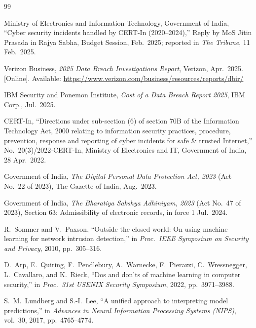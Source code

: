\documentclass[12pt,a4paper,oneside]{article}
\begin{document}
\begingroup
{}\small
\renewcommand{\refname}{\color{rblue}References}
\begin{thebibliography}{99}

 Ministry of Electronics and Information Technology, Government of India, ``Cyber security incidents handled by CERT-In (2020--2024),'' Reply by MoS Jitin Prasada in Rajya Sabha, Budget Session, Feb.\ 2025; reported in \emph{The Tribune}, 11 Feb.\ 2025.

 Verizon Business, \emph{2025 Data Breach Investigations Report}, Verizon, Apr.\ 2025. [Online]. Available: \url{https://www.verizon.com/business/resources/reports/dbir/}

 IBM Security and Ponemon Institute, \emph{Cost of a Data Breach Report 2025}, IBM Corp., Jul.\ 2025.

 CERT-In, ``Directions under sub-section (6) of section 70B of the Information Technology Act, 2000 relating to information security practices, procedure, prevention, response and reporting of cyber incidents for safe \& trusted Internet,'' No.\ 20(3)/2022-CERT-In, Ministry of Electronics and IT, Government of India, 28 Apr.\ 2022.

 Government of India, \emph{The Digital Personal Data Protection Act, 2023} (Act No.\ 22 of 2023), The Gazette of India, Aug.\ 2023.

 Government of India, \emph{The Bharatiya Sakshya Adhiniyam, 2023} (Act No.\ 47 of 2023), Section 63: Admissibility of electronic records, in force 1 Jul.\ 2024.

 R.~Sommer and V.~Paxson, ``Outside the closed world: On using machine learning for network intrusion detection,'' in \emph{Proc.\ IEEE Symposium on Security and Privacy}, 2010, pp.\ 305--316.

 D.~Arp, E.~Quiring, F.~Pendlebury, A.~Warnecke, F.~Pierazzi, C.~Wressnegger, L.~Cavallaro, and K.~Rieck, ``Dos and don'ts of machine learning in computer security,'' in \emph{Proc.\ 31st USENIX Security Symposium}, 2022, pp.\ 3971--3988.

 S.~M.~Lundberg and S.-I.~Lee, ``A unified approach to interpreting model predictions,'' in \emph{Advances in Neural Information Processing Systems (NIPS)}, vol.~30, 2017, pp.\ 4765--4774.


\end{thebibliography}
\end{document}
